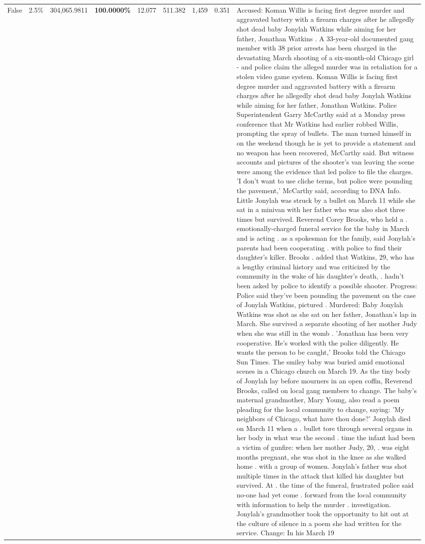\begin{table}[H]
\begin{tabular}{lllrlllll}
False & 2.5\% & \color{red} 304,065.9811 & \bfseries \color{red} 100.0000\% & 12.077 & 511.382 & 1,459 & 0.351 & Accused: Koman Willis is facing first degree murder and aggravated battery with a firearm charges after he allegedly shot dead baby Jonylah Watkins while aiming for her father, Jonathan Watkins . A 33-year-old documented gang member with 38 prior arrests has been charged in the devastating March shooting of a six-month-old Chicago girl - and police claim the alleged murder was in retaliation for a stolen video game system. Koman Willis is facing first degree murder and aggravated battery with a firearm charges after he allegedly shot dead baby Jonylah Watkins while aiming for her father, Jonathan Watkins. Police Superintendent Garry McCarthy said at a Monday press conference that Mr Watkins had earlier robbed Willis, prompting the spray of bullets. The man turned himself in on the weekend though he is yet to provide a statement and no weapon has been recovered, McCarthy said. But witness accounts and pictures of the shooter's van leaving the scene were among the evidence that led police to file the charges. 'I don't want to use cliche terms, but police were pounding the pavement,' McCarthy said, according to DNA Info. Little Jonylah was struck by a bullet on March 11 while she sat in a minivan with her father who was also shot three times but survived. Reverend Corey Brooks, who held a . emotionally-charged funeral service for the baby in March and is acting . as a spokesman for the family, said Jonylah's parents had been cooperating . with police to find their daughter's killer. Brooks . added that Watkins, 29, who has a lengthy criminal history and was criticized by the community in the wake of his daughter's death, . hadn't been asked by police to identify a possible shooter. Progress: Police said they've been pounding the pavement on the case of Jonylah Watkins, pictured . Murdered: Baby Jonylah Watkins was shot as she sat on her father, Jonathan's lap in March. She survived a separate shooting of her mother Judy when she was still in the womb . 'Jonathan has been very cooperative. He's worked with the police diligently. He wants the person to be caught,' Brooks told the Chicago Sun Times. The smiley baby was buried amid emotional scenes in a Chicago church on March 19. As the tiny body of Jonylah lay before mourners in an open coffin, Reverend Brooks, called on local gang members to change. The baby's maternal grandmother, Mary Young, also read a poem pleading for the local community to change, saying: 'My neighbors of Chicago, what have thou done?' Jonylah died on March 11 when a . bullet tore through several organs in her body in what was the second . time the infant had been a victim of gunfire: when her mother Judy, 20, . was eight months pregnant, she was shot in the knee as she walked home . with a group of women. Jonylah's father was shot multiple times in the attack that killed his daughter but survived. At . the time of the funeral, frustrated police said no-one had yet come . forward from the local community with information to help the murder . investigation. Jonylah's grandmother took the opportunity to hit out at the culture of silence in a poem she had written for the service. Change: In his March 19 
\end{tabular}
\end{table}
